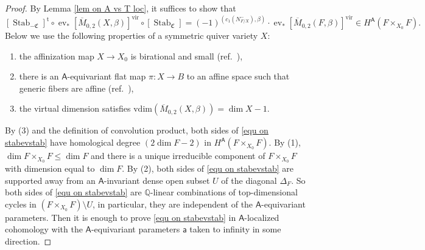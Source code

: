 \documentclass[10pt]{amsart}
\theoremstyle{definition}
\numberwithin{equation}{section}
\newcommand{\bQ}{\mathbb{Q}}
\newcommand{\fC}{\mathfrak{C}}
\newcommand{\vir}{\mathrm{vir}}
\newcommand{\sA}{\mathsf{A}}
\newcommand{\ev}{\operatorname{ev}}
\newcommand{\Stab}{\operatorname{Stab}}
\begin{document}
\begin{proof}
By Lemma \ref{lem on A vs T loc}, it suffices to show that 
\begin{equation}\label{equ on stabevstab}[\Stab_{-\fC}]^{\mathrm{t}}\circ\ev_*[\overline{M}_{0,2}(X,\beta)]^{\vir}\circ[\Stab_\fC]=(-1)^{(c_1(N^-_{F/X}),\beta)}\cdot\ev_*[\overline{M}_{0,2}(F,\beta)]^{\vir}\in H^{\sA}(F\times_{X_0}F).\end{equation} 
Below we use the following properties of a symmetric quiver variety $X$: 
\begin{enumerate}
\item the affinization map $X\to X_0$ is birational and small (ref.~\cite[Thm.~1.1]{COZZ3}), 
\item there is an $\sA$-equivariant flat map $\pi\colon X\to B$ to an affine space such that generic fibers are affine (ref.~\cite[Thm.~1.1]{COZZ3}), 
\item the virtual dimension satisfies $\mathrm{vdim}(\overline{M}_{0,2}(X,\beta))=\dim X-1$.
\end{enumerate}
By (3) and the definition of convolution product, both sides of \eqref{equ on stabevstab} have homological degree $(2\dim F-2)$ in $ H^{\sA}(F\times_{X_0}F)$. By (1), $\dim F\times_{X_0}F\leqslant \dim F$ and there is a unique irreducible component of $F\times_{X_0}F$ with dimension equal to $\dim F$. By (2), both sides of \eqref{equ on stabevstab} are supported away from an $\sA$-invariant dense open subset $U$ of the diagonal $\Delta_F$. So both sides of \eqref{equ on stabevstab} are $\bQ$-linear combinations of top-dimensional cycles in $(F\times_{X_0}F)\setminus U$, in particular, they are independent of the $\sA$-equivariant parameters. Then it is enough to prove \eqref{equ on stabevstab} in $\sA$-localized cohomology with the $\sA$-equivariant parameters $\mathsf a$ taken to infinity in some direction.


\end{proof}
\end{document}
